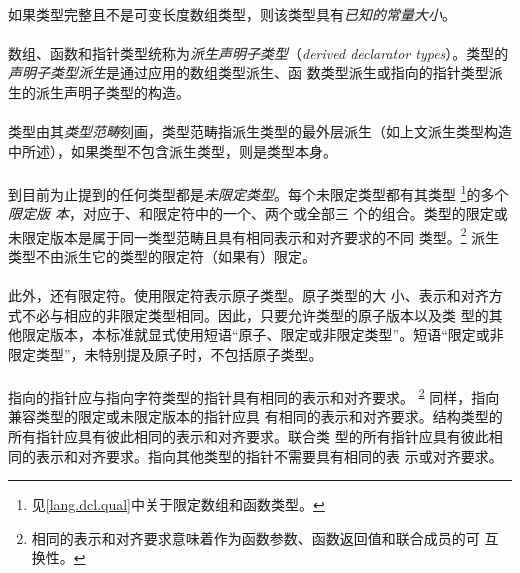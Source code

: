 {\paragraph{}
如果类型完整且不是可变长度数组类型，则该类型具有\textit{已知的常量大小}。

\paragraph{}
数组、函数和指针类型统称为\textit{派生声明子类型}（\textit{derived declarator
types}）。类型的\textit{声明子类型派生}是通过应用的数组类型派生、函
数类型派生或指向的指针类型派生的派生声明子类型的构造。

\paragraph{}
类型由其\textit{类型范畴}刻画，类型范畴指派生类型的最外层派生（如上文派生类型构造
中所述），如果类型不包含派生类型，则是类型本身。

\paragraph{}
到目前为止提到的任何类型都是\textit{未限定类型}。每个未限定类型都有其类型
\footnote{见\ref{lang.dcl.qual}中关于限定数组和函数类型。}的多个\textit{限定版
本}，对应于、和限定符中的一个、两个或全部三
个的组合。类型的限定或未限定版本是属于同一类型范畴且具有相同表示和对齐要求的不同
类型。\footnote{相同的表示和对齐要求意味着作为函数参数、函数返回值和联合成员的可
互换性。\label{interchg}} 派生类型不由派生它的类型的限定符（如果有）限定。

\paragraph{}
此外，还有限定符。使用限定符表示原子类型。原子类型的大
小、表示和对齐方式不必与相应的非限定类型相同。因此，只要允许类型的原子版本以及类
型的其他限定版本，本标准就显式使用短语``原子、限定或非限定类型''。短语``限定或非
限定类型''，未特别提及原子时，不包括原子类型。

\paragraph{}
指向的指针应与指向字符类型的指针具有相同的表示和对齐要求。
\textsuperscript{\ref{interchg}} 同样，指向兼容类型的限定或未限定版本的指针应具
有相同的表示和对齐要求。结构类型的所有指针应具有彼此相同的表示和对齐要求。联合类
型的所有指针应具有彼此相同的表示和对齐要求。指向其他类型的指针不需要具有相同的表
示或对齐要求。

}
